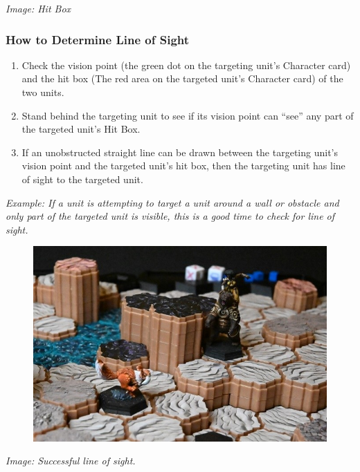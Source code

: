\documentclass[../main.tex]{subfiles}
\begin{document}
\textit{Image: Hit Box}

\subsubsection{How to Determine Line of Sight}
\begin{enumerate}
    \item Check the vision point (the green dot on the targeting unit’s Character card) and the hit box (The red area on the targeted unit’s Character card) of the two units.
    \item Stand behind the targeting unit to see if its vision point can “see” any part of the targeted unit’s Hit Box.
    \item If an unobstructed straight line can be drawn between the targeting unit’s vision point and the targeted unit’s hit box, then the targeting unit has line of sight to the targeted unit.
\end{enumerate}

\textit{Example: If a unit is attempting to target a unit around a wall or obstacle and only part of the targeted unit is visible, this is a good time to check for line of sight.}

\begin{figure}[h]
    \centering
    \includegraphics[width=1\linewidth]{chapters//TargetingandCombat/TimeStrikeLineofSight.jpg}
\end{figure}

\textit{Image: Successful line of sight.}
\end{document}
